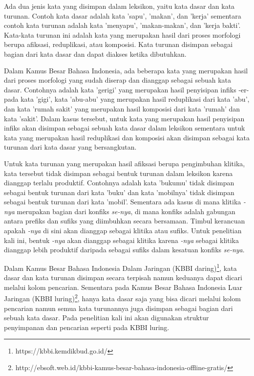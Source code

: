 Ada dua jenis kata yang disimpan dalam leksikon, yaitu kata dasar dan kata turunan. Contoh kata dasar adalah kata 'sapu', 'makan', dan 'kerja' sementara contoh kata turunan adalah kata 'menyapu', 'makan-makan', dan 'kerja bakti'. Kata-kata turunan ini adalah kata yang merupakan hasil dari proses morfologi berupa afiksasi, reduplikasi, atau komposisi. Kata turunan disimpan sebagai bagian dari kata dasar dan dapat diakses ketika dibutuhkan. 

Dalam Kamus Besar Bahasa Indonesia, ada beberapa kata yang merupakan hasil dari proses morfologi yang sudah diserap dan dianggap sebagai sebuah kata dasar. Contohnya adalah kata 'gerigi' yang merupakan hasil penyisipan infiks -er- pada kata 'gigi', kata 'abu-abu' yang merupakan hasil reduplikasi dari kata 'abu', dan kata 'rumah sakit' yang merupakan hasil komposisi dari kata 'rumah' dan kata 'sakit'. Dalam kasus tersebut, untuk kata yang merupakan hasil penyisipan infiks akan disimpan sebagai sebuah kata dasar dalam leksikon sementara untuk kata yang merupakan hasil reduplikasi dan komposisi akan disimpan sebagai kata turunan dari kata dasar yang bersangkutan.

Untuk kata turunan yang merupakan hasil afiksasi berupa pengimbuhan klitika, kata tersebut tidak disimpan sebagai bentuk turunan dalam leksikon karena dianggap terlalu produktif. Contohnya adalah kata 'bukumu' tidak disimpan sebagai bentuk turunan dari kata 'buku' dan kata 'mobilnya' tidak disimpan sebagai bentuk turunan dari kata 'mobil'. Sementara ada kasus di mana klitika \textit{-nya} merupakan bagian dari konfiks \textit{se-nya}, di mana konfiks adalah gabungan antara prefiks dan sufiks yang diimbuhkan secara bersamaan. Timbul kerancuan apakah \textit{-nya} di sini akan dianggap sebagai klitika atau sufiks. Untuk penelitian kali ini, bentuk \textit{-nya} akan dianggap sebagai klitika karena \textit{-nya} sebagai klitika dianggap lebih produktif daripada sebagai sufiks dalam kesatuan konfiks \textit{se-nya}.

Dalam Kamus Besar Bahasa Indonesia Dalam Jaringan (KBBI daring)\footnote{https://kbbi.kemdikbud.go.id/}, kata dasar dan kata turunan disimpan secara terpisah namun keduanya dapat dicari melalui kolom pencarian. Sementara pada Kamus Besar Bahasa Indonesia Luar Jaringan (KBBI luring)\footnote{http://ebsoft.web.id/kbbi-kamus-besar-bahasa-indonesia-offline-gratis/}, hanya kata dasar saja yang bisa dicari melalui kolom pencarian namun semua kata turunannya juga disimpan sebagai bagian dari sebuah kata dasar. Pada penelitian kali ini akan digunakan struktur penyimpanan dan pencarian seperti pada KBBI luring.

